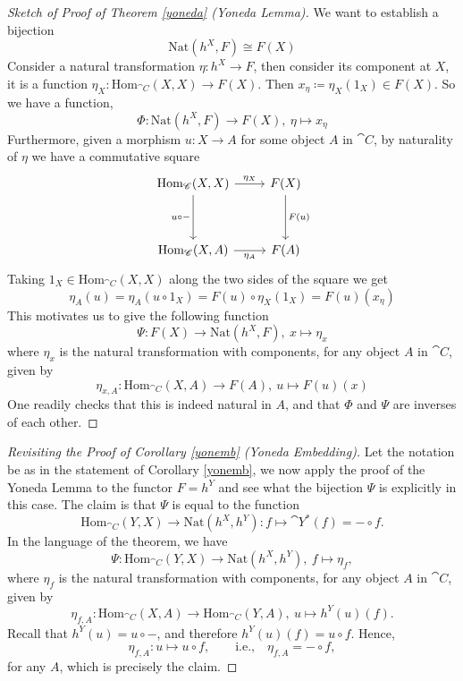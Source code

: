 \begin{proof}[Sketch of Proof of Theorem \ref{yoneda} (Yoneda Lemma)]
We want to establish a bijection
\[\mathrm{Nat}(h^X,F) \cong F(X)\]
Consider a natural transformation $\eta:h^X \to F$, then consider its component at $X$, it is a function $\eta_X: \mathrm{Hom}_{\cat{C}}(X,X) \to F(X)$. Then $x_\eta \coloneqq \eta_X(1_X) \in F(X)$. So we have a function,
\[\Phi: \mathrm{Nat}(h^X,F) \to F(X),\ \eta \mapsto x_\eta\]
Furthermore, given a morphism $u:X \to A$ for some object $A$ in $\cat{C}$, by naturality of $\eta$ we have a commutative square
\[\begin{tikzcd}[row sep=huge]
{\mathrm{Hom}_{\cat{C}}(X,X)} \arrow[d, "u\circ-"'] \arrow[r, "\eta_X"] & F(X) \arrow[d, "F(u)"] \\
{\mathrm{Hom}_{\cat{C}}(X,A)} \arrow[r, "\eta_A"']                       & F(A)                 
\end{tikzcd}\]
Taking $1_X \in \mathrm{Hom}_{\cat{C}}(X,X)$ along the two sides of the square we get
\[\eta_A(u) = \eta_A(u\circ 1_X) = F(u)\circ\eta_X(1_X) = F(u)(x_\eta)\]
This motivates us to give the following function
\[\Psi:F(X) \to \mathrm{Nat}(h^X,F),\ x \mapsto \eta_x\]
where $\eta_x$ is the natural transformation with components, for any object $A$ in $\cat{C}$, given by
\[\eta_{x,A}:\mathrm{Hom}_{\cat{C}}(X,A) \to F(A),\ u \mapsto F(u)(x)\]
One readily checks that this is indeed natural in $A$, and that $\Phi$ and $\Psi$ are inverses of each other.
\end{proof}

\vspace*{0.1in}

\begin{proof}[Revisiting the Proof of Corollary \ref{yonemb} (Yoneda Embedding)] Let the notation be as in the statement of Corollary \ref{yonemb}, we now apply the proof of the Yoneda Lemma to the functor $F = h^Y$ and see what the bijection $\Psi$ is explicitly in this case. The claim is that $\Psi$ is equal to the function
\[\mathrm{Hom}_{\cat{C}}(Y,X) \to \mathrm{Nat}(h^X,h^Y): f \mapsto \cat{Y}^*(f) = -\circ f.\]
In the language of the theorem, we have
\[\Psi:\mathrm{Hom}_{\cat{C}}(Y,X) \to \mathrm{Nat}(h^X,h^Y),\ f \mapsto \eta_f,\]
where $\eta_f$ is the natural transformation with components, for any object $A$ in $\cat{C}$, given by
\[\eta_{f,A}:\mathrm{Hom}_{\cat{C}}(X,A) \to \mathrm{Hom}_{\cat{C}}(Y,A),\ u \mapsto h^Y(u)(f).\]
Recall that $h^Y(u) = u\circ -$, and therefore $h^Y(u)(f) = u\circ f$. Hence, 
\[\eta_{f,A}:u \mapsto u \circ f,\qquad \text{i.e.,}\quad \eta_{f,A} = -\circ f,\]
for any $A$, which is precisely the claim.
\end{proof}


